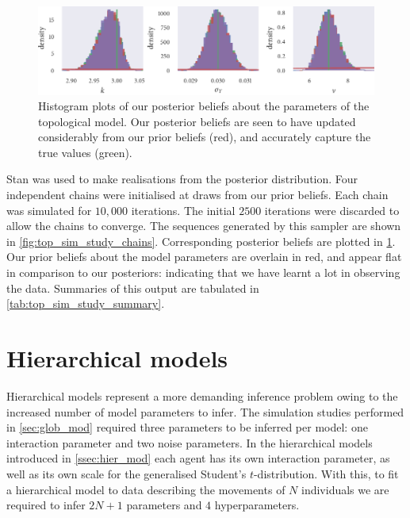 \begin{figure}[tbp]
  \includegraphics{stan_top_hist.pdf}
  \caption{Histogram plots of our posterior beliefs about the parameters of the
    topological model. Our posterior beliefs are seen to have updated considerably from our
    prior beliefs (red), and accurately capture the true values (green).}
    \label{fig:top_sim_study_hists}
\end{figure}

Stan was used to make realisations from the posterior distribution. Four independent
chains were initialised at draws from our prior beliefs. Each chain was simulated for
$10,000$ iterations. The initial $2500$ iterations were discarded to allow the chains to
converge. The sequences generated by this sampler are shown in
\cref{fig:top_sim_study_chains}. Corresponding posterior beliefs are plotted in
\cref{fig:top_sim_study_hists}. Our prior beliefs about the model parameters are overlain
in red, and appear flat in comparison to our posteriors: indicating that we have learnt a
lot in observing the data. Summaries of this output are tabulated in
\cref{tab:top_sim_study_summary}.

\section{Hierarchical models}

Hierarchical models represent a more demanding inference problem owing to the increased
number of model parameters to infer. The simulation studies performed in
\cref{sec:glob_mod} required three parameters to be inferred per model: one interaction
parameter and two noise parameters. In the hierarchical models introduced in
\cref{ssec:hier_mod} each agent has its own interaction parameter, as well as its own
scale for the generalised Student's $t$-distribution. With this, to fit a hierarchical
model to data describing the movements of $N$ individuals we are required to infer $2N+1$
parameters and $4$ hyperparameters.



